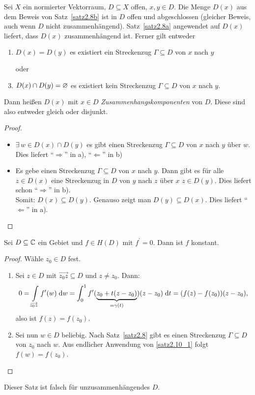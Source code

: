 \documentclass[a4paper,twoside,DIV15,BCOR12mm]{scrbook}
\begin{document}
\begin{bem} \label{bem2.9}
  Sei $X$ ein normierter Vektorraum, $D\subseteq X$ offen, $x, y\in D$. Die Menge $D(x)$ aus dem Beweis von
  Satz~\ref{satz2.8b} ist in $D$ offen und abgeschlossen (gleicher Beweis, auch wenn $D$ nicht
  zusammenhängend). Satz~\ref{satz2.8a} angewendet auf $D(x)$ liefert, dass $D(x)$ zusammenhängend ist. Ferner
  gilt entweder
  \begin{enumerate}
  \item $D(x)=D(y)$ \gdw es existiert ein Streckenzug $\Gamma\subseteq D$ von $x$ nach $y$
  \item[oder]
  \item $D(x)\cap D(y)=\varnothing$ \gdw es existiert kein Streckenzug $\Gamma\subseteq D$ von $x$ nach $y$.
  \end{enumerate}
  Dann heißen $D(x)$ mit $x\in D$ \emph{Zusammenhangskomponenten} von $D$. Diese sind also entweder gleich oder disjunkt.
\end{bem}
\begin{proof}
  \begin{itemize}
  \item $\exists\,w\in D(x)\cap D(y)$ \folgt es gibt einen Streckenzug $\Gamma\subseteq D$ von $x$ nach $y$ über $w$. Dies
    liefert "`$\Rightarrow$"' in a), "`$\Leftarrow$"' in b)
  \item Es gebe einen Streckenzug $\Gamma\subseteq D$ von $x$ nach $y$. Dann gibt es für alle $z\in D(x)$ eine Streckenzug in
    $D$ von $y$ nach $z$ über $x$ \folgt $z\in D(y)$. Dies liefert schon "`$\Rightarrow$"' in b).\\
    Somit: $D(x)\subseteq D(y)$. Genauso zeigt man $D(y)\subseteq D(x)$. Dies liefert "`$\Leftarrow$"' in a). \qedhere
  \end{itemize}
\end{proof}

\begin{satz} \label{satz2.10}
  Sei $D\subseteq\mathbb{C}$ ein Gebiet und $f\in H(D)$ mit $f^\prime=0$. Dann ist $f$ konstant.
\end{satz}
\begin{proof}
  Wähle $z_0\in D$ fest.
  \begin{enumerate}
  \item \label{satz2.10_1} Sei $z\in D$ mit $\overrightarrow{z_0z}\subseteq D$ und $z\neq z_0$. Dann:
    \[ 0=\int\limits_{\overrightarrow{z_0z}}^{}{f^\prime(w)}\;\mathrm{d}w =
    \int_{0}^{1}{f^\prime(\underbrace{z_0+t(z-z_0)}_{=\gamma(t)})(z-z_0)}\;\mathrm{d} t = (f(z)-f(z_0))(z-z_0), \]
    also ist $f(z)=f(z_0)$.
  \item Sei nun $w\in D$ beliebig. Nach Satz~\ref{satz2.8} gibt es einen Streckenzug $\Gamma\subseteq D$ von $z_0$ nach $w$. Aus
    endlicher Anwendung von \ref{satz2.10_1} folgt $f(w)=f(z_0)$. \qedhere 
  \end{enumerate}
\end{proof}
\begin{bem*}
  Dieser Satz ist falsch für unzusammenhängendes $D$.
\end{bem*}
\end{document}
